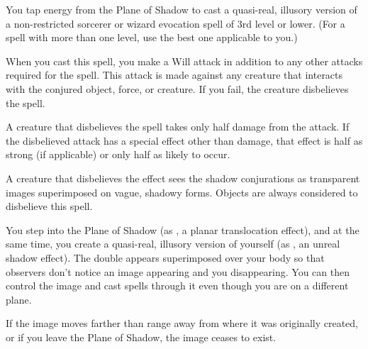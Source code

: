 \begin{spelleffect}
  You tap energy from the Plane of Shadow to cast a quasi-real, illusory version of a non-restricted sorcerer or wizard evocation spell of 3rd level or lower. (For a spell with more than one level, use the best one applicable to you.)
  \par When you cast this spell, you make a Will attack in addition to any other attacks required for the spell. This attack is made against any creature that interacts with the conjured object, force, or creature. If you fail, the creature disbelieves the spell.
  \par A creature that disbelieves the spell takes only half damage from the attack. If the disbelieved attack has a special effect other than damage, that effect is half as strong (if applicable) or only half as likely to occur.
\end{spelleffect}
\begin{spellnotes}
  A creature that disbelieves the effect sees the shadow conjurations as transparent images superimposed on vague, shadowy forms. Objects are always considered to disbelieve this spell.
\end{spellnotes}

\spelldur{\durmed}
\begin{spelleffect}
  You step into the Plane of Shadow (as , a planar translocation effect), and at the same time, you create a quasi-real, illusory version of yourself (as , an unreal shadow effect). The double appears superimposed over your body so that observers don't notice an image appearing and you disappearing. You can then control the image and cast spells through it even though you are on a different plane.
\end{spelleffect}
\begin{spellnotes}
  If the image moves farther than \rngfar range away from where it was originally created, or if you leave the Plane of Shadow, the image ceases to exist.
\end{spellnotes}

